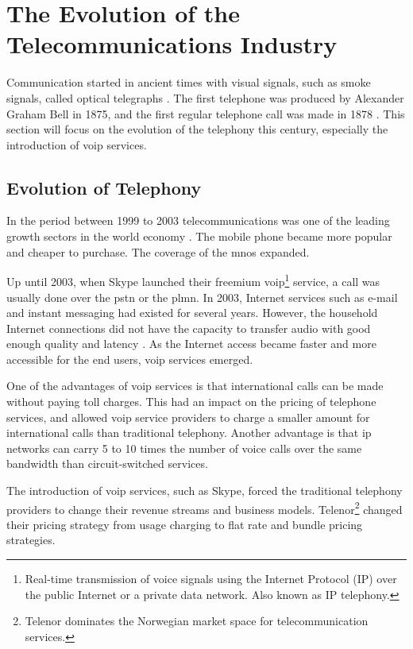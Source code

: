 \section{The Evolution of the Telecommunications Industry}
Communication started in ancient times with visual signals, such as smoke signals, called optical telegraphs \cite{itu50years}. The first telephone was produced by Alexander Graham Bell in 1875, and the first regular telephone call was made in 1878 \cite{hallock2004brief}. This section will focus on the evolution of the telephony this century, especially the introduction of \gls{voip} services. 


\subsection{Evolution of Telephony}
In the period between 1999 to 2003 telecommunications was one of the leading growth sectors in the world economy \cite{itu50years}. The mobile phone became more popular and cheaper to purchase. The coverage of the \glspl{mno} expanded.

Up until 2003, when Skype launched their freemium \gls{voip}\footnote{Real-time transmission of voice signals using 
the Internet Protocol (IP) over the public Internet or a private data network. Also known as IP telephony.} service, a call was usually done over the \gls{pstn} or the \gls{plmn}. In 2003, Internet services such as e-mail and instant messaging had existed for several years. However, the household Internet connections did not have the capacity to transfer audio with good enough quality and latency \cite{thomasbruun}. As the Internet access became faster and more accessible for the end users, \gls{voip} services emerged. 

One of the advantages of \gls{voip} services is that international calls can be made without paying toll charges. This had an impact on the pricing of telephone services, and allowed \gls{voip} service providers to charge a smaller amount for international calls than traditional telephony. Another advantage is that \gls{ip} networks can carry 5 to 10 times the number of voice calls over the same bandwidth than circuit-switched services. 

The introduction of \gls{voip} services, such as Skype, forced the traditional telephony providers to change their revenue streams and business models. Telenor\footnote{Telenor dominates the Norwegian market space for telecommunication services.} changed their pricing strategy from usage charging to flat rate and bundle pricing strategies. 


